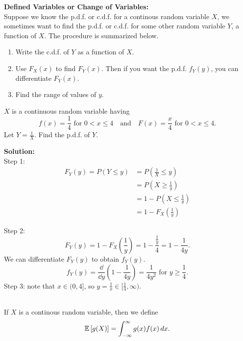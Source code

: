 \pagebreak

\textbf{Defined Variables or Change of Variables:}  \\
Suppose we know the p.d.f. or c.d.f. for a continous random variable $X$, we sometimes want to find
the p.d.f. or c.d.f. for some other random variable $Y$, a function of $X$. The procedure is summarized below.
\begin{enumerate}
    \item Write the c.d.f. of $Y$ as a function of $X$.
    \item Use $F_X(x)$ to find $F_Y(x)$. Then if you want the p.d.f. $f_Y(y)$, you can differentiate $F_Y(x)$.
    \item Find the range of values of $y$.
\end{enumerate}

\begin{example}
    $X$ is a continuous random variable having
    \[
        f(x) = \frac{1}{4} \text{ for $0 < x \leq 4$} \quad \text{and} \quad F(x) = \frac{x}{4} \text{ for $0 < x \leq 4$}.
    \]
    Let $Y = \frac{1}{X}$. Find the p.d.f. of $Y$.


    \textbf{Solution:} \\
    Step 1: \vspace{-3mm}
    \begin{align*}
        F_Y(y) = P(Y\leq y) &= P(\frac{1}{X} \leq y) \\
        &= P(X \geq \frac{1}{y}) \\
        &= 1 - P(X \leq \frac{1}{y}) \\
        &= 1 - F_X(\frac{1}{y})
    \end{align*}

    Step 2: 
    \[
        F_Y(y) = 1 - F_X(\frac{1}{y}) = 1 - \frac{\frac{1}{y}}{4} = 1 - \frac{1}{4y}.
    \]
    We can differentiate $F_Y(y)$ to obtain $f_Y(y)$. 
    \[
        f_Y(y) = \frac{\dd}{\dd{y}} \left( 1 - \frac{1}{4y} \right) = \frac{1}{4y^2} \text{ for $y \geq \frac{1}{4}$}.
    \]
    Step 3: note that $x \in (0,4]$, so $y = \frac{1}{x} \in [\frac{1}{4},\infty)$.
\end{example}

\pagebreak

\begin{definition}
    \phantom{}  \\
    If $X$ is a continous random variable, then we define
    \[
        \mathbb{E}\left[{g(X)}\right] = \displaystyle \int_{-\infty}^{\infty} g(x)f(x) \, dx.
    \]
\end{definition}

